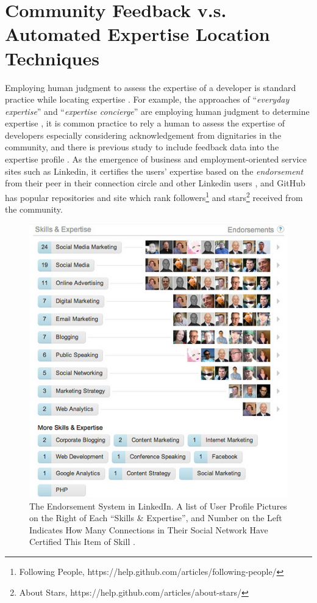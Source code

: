 \section{Community Feedback v.s. Automated Expertise Location Techniques}

Employing human judgment to assess the expertise of a developer is standard practice while locating expertise \cite{mcdonald1998just}. For example, the approaches of ``\textit{everyday expertise}'' and ``\textit{expertise concierge}'' are employing human judgment to determine expertise \cite{mcdonald1998just}, it is common practice to rely a human to assess the expertise of developers especially considering acknowledgement from dignitaries in the community, and there is previous study to include feedback data into the expertise profile \cite{Reichling2007}. As the emergence of business and employment-oriented service sites such as Linkedin, it certifies the users' expertise based on the \textit{endorsement} from their peer in their connection circle and other Linkedin users \cite{linkedin}, and GitHub has popular repositories and site which rank followers\footnote{Following People, https://help.github.com/articles/following-people/} and stars\footnote{About Stars, https://help.github.com/articles/about-stars/} received from the community.

\begin{figure}
\includegraphics[width = 0.6\columnwidth]{linkedin-endorsements.jpg}
\centering
\caption{The Endorsement System in LinkedIn. A list of User Profile Pictures on the Right of Each ``Skills \& Expertise'', and Number on the Left Indicates How Many Connections in Their Social Network Have Certified This Item of Skill \cite{endorsement}.}
\label{endorsement}
\end{figure}

